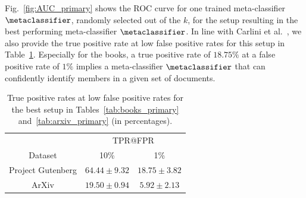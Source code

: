 \documentclass[twocolumn,10pt]{article}
\begin{document}
Fig.~\ref{fig:AUC_primary} shows the ROC curve for one trained meta-classifier $\metaclassifier$, randomly selected out of the $k$, for the setup resulting in the best performing meta-classifier $\metaclassifier$. In line with Carlini et al.~\cite{carlini2022membership}, we also provide the true positive rate at low false positive rates for this setup in Table~\ref{tab:tpr_fpr}. Especially for the books, a true positive rate of $18.75\%$ at a false positive rate of $1\%$ implies a meta-classifier $\metaclassifier$ that can confidently identify members in a given set of documents.

\begin{table}[ht]
    \centering
    \begin{tabular}{ccc}
    \toprule
         & \multicolumn{2}{c}{TPR@FPR} \\
        Dataset & 10\% & 1\% \\
        \midrule 
         Project Gutenberg & $64.44 \pm 9.32$ & $18.75 \pm 3.82$\\ 
        \cmidrule{2-3}
        ArXiv & $19.50 \pm 0.94$ & $5.92 \pm 2.13$ \\ 
        \bottomrule
    \end{tabular}
    \caption{True positive rates at low false positive rates for the best setup in Tables~\ref{tab:books_primary} and~\ref{tab:arxiv_primary} (in percentages).}
    \label{tab:tpr_fpr}
\end{table}
\end{document}
